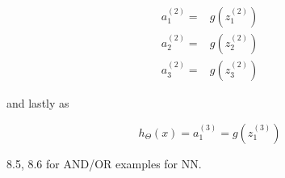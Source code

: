 \begin{align}\label{fig:app:activationfunctiontoneuralnetworkrewritten}
    a^{(2)}_1 =& g(z_1^{(2)}) \\
    a^{(2)}_2 =& g(z_2^{(2)}) \\
    a^{(2)}_3 =& g(z_3^{(2)})
\end{align}

and lastly as

\begin{equation}
  h_\Theta(x) = a_1^{(3)} = g(z_1^{(3)})
\end{equation}

8.5, 8.6 for AND/OR examples for NN.

